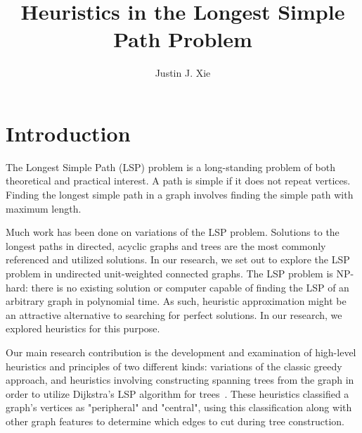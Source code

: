 \documentclass[twocolumn,showpacs,%
  nofootinbib,aps,superscriptaddress,%
  eqsecnum,prd,notitlepage,showkeys,11pt]{article}
\begin{document}
\title{Heuristics in the Longest Simple Path Problem}
\author[1]{Justin J. Xie}
\date{}


\section{Introduction}

The Longest Simple Path (LSP) problem is a long-standing problem of both theoretical and practical interest. A path is simple if it does not repeat vertices. Finding the longest simple path in a graph involves finding the simple path with maximum length. 

Much work has been done on variations of the LSP problem. Solutions to the longest paths in directed, acyclic graphs and trees are the most commonly referenced and utilized solutions. In our research, we set out to explore the LSP problem in undirected unit-weighted connected graphs. The LSP problem is NP-hard: there is no existing solution or computer capable of finding the LSP of an arbitrary graph in polynomial time. As such, heuristic approximation might be an attractive alternative to searching for perfect solutions. In our research, we explored heuristics for this purpose.

Our main research contribution is the development and examination of high-level heuristics and principles of two different kinds: variations of the classic greedy approach, and heuristics involving constructing spanning trees from the graph in order to utilize Dijkstra's LSP algorithm for trees~\cite{club2002computing}. These heuristics classified a graph's vertices as "peripheral" and "central", using this classification along with other graph features to determine which edges to cut during tree construction.
\end{document}
